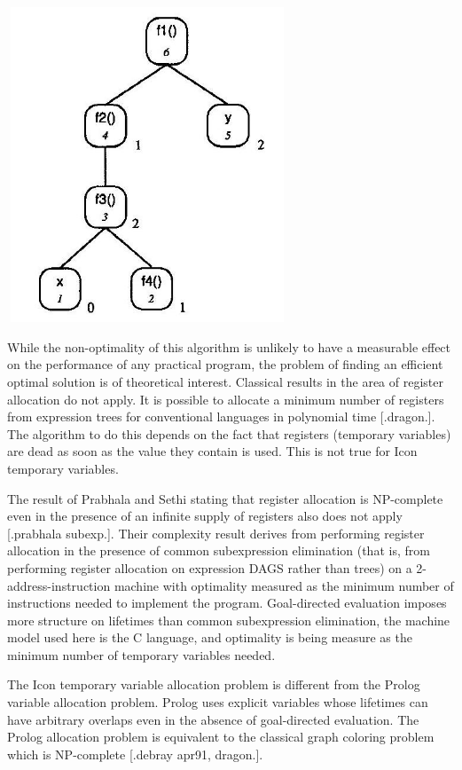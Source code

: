{\centering{}
\includegraphics[width=3.3in,height=3.7in]{kw/figure8-7.png}  
\par}


While the non-optimality of this algorithm is unlikely to have a
measurable effect on the performance of any practical program, the
problem of finding an efficient optimal solution is of theoretical
interest. Classical results in the area of register allocation do not
apply. It is possible to allocate a minimum number of registers from
expression trees for conventional languages in polynomial time
[.dragon.]. The algorithm to do this depends on the fact that
registers (temporary variables) are dead as soon as the value they
contain is used. This is not true for Icon temporary variables.

The result of Prabhala and Sethi stating that register allocation is
NP-complete even in the presence of an infinite supply of registers
also does not apply [.prabhala subexp.]. Their complexity result
derives from performing register allocation in the presence of common
subexpression elimination (that is, from performing register
allocation on expression DAGS rather than trees) on a
2-address-instruction machine with optimality measured as the minimum
number of instructions needed to implement the program. Goal-directed
evaluation imposes more structure on lifetimes than common
subexpression elimination, the machine model used here is the C
language, and optimality is being measure as the minimum number of
temporary variables needed.

The Icon temporary variable allocation problem is different from the
Prolog variable allocation problem. Prolog uses explicit variables
whose lifetimes can have arbitrary overlaps even in the absence of
goal-directed evaluation. The Prolog allocation problem is equivalent
to the classical graph coloring problem which is NP-complete [.debray
apr91, dragon.].


